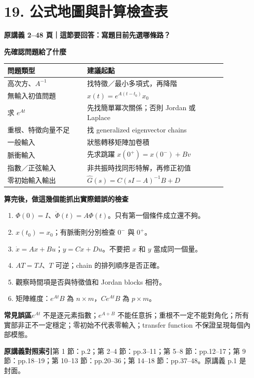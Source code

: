 \documentclass[12pt,a4paper]{article}
\newcommand{\topic}[3]{\clearpage\section*{#1}\textcolor{accent}{\textbf{原講義 #2 頁｜這節要回答：#3}}\par}
\begin{document}
\topic{19. 公式地圖與計算檢查表}{2--48}{寫題目前先選哪條路？}
\textbf{先確認問題給了什麼}
\begin{center}\small
\begin{tabular}{p{0.32\linewidth}p{0.56\linewidth}}
\toprule 問題類型 & 建議起點\\\midrule
高次方、$A^{-1}$ & 找特徵／最小多項式，再降階\\
無輸入初值問題 & $x(t)=e^{A(t-t_0)}x_0$\\
求 $e^{At}$ & 先找簡單冪次關係；否則 Jordan 或 Laplace\\
重根、特徵向量不足 & 找 generalized eigenvector chains\\
一般輸入 & 狀態轉移矩陣加卷積\\
脈衝輸入 & 先求跳躍 $x(0^+)=x(0^-)+Bv$\\
指數／正弦輸入 & 非共振時找同形特解，再修正初值\\
零初始輸入輸出 & $\widehat G(s)=C(sI-A)^{-1}B+D$\\\bottomrule
\end{tabular}
\end{center}
\textbf{算完後，做這幾個能抓出實際錯誤的檢查}
\begin{enumerate}
\item $\Phi(0)=I$、$\dot\Phi(t)=A\Phi(t)$。只有第一個條件成立還不夠。
\item $x(t_0)=x_0$；有脈衝則分別檢查 $0^-$ 與 $0^+$。
\item $\dot x=Ax+Bu$；$y=Cx+Du$。不要把 $x$ 和 $y$ 當成同一個量。
\item $AT=TJ$、$T$ 可逆；chain 的排列順序是否正確。
\item 觀察時間項是否與特徵值和 Jordan blocks 相符。
\item 矩陣維度：$e^{At}B$ 為 $n\times m$，$Ce^{At}B$ 為 $p\times m$。
\end{enumerate}
\textbf{常見誤區}\quad $e^{At}$ 不是逐元素指數；$e^{A+B}$ 不能任意拆；重根不一定不能對角化；所有實部非正不一定穩定；零初始不代表零輸入；transfer function 不保證呈現每個內部模態。

\textbf{原講義對照索引}\quad 第 1 節：p.2；第 2--4 節：pp.3--11；第 5--8 節：pp.12--17；第 9 節：pp.18--19；第 10--13 節：pp.20--36；第 14--18 節：pp.37--48。原講義 p.1 是封面。
\end{document}
